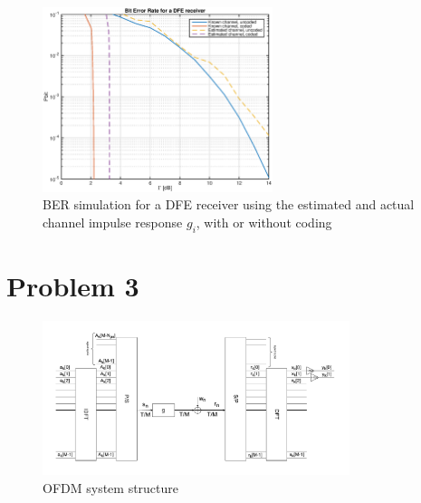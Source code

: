 \documentclass[10pt]{article}
\begin{document}

\begin{figure}[H]
	\centering
	\includegraphics[width = 0.6\textwidth]{problem2}
	\caption{BER simulation for a DFE receiver using the estimated and actual channel impulse response $g_i$, with or without coding}
	\label{fig:problem2_pbit}
\end{figure}

\FloatBarrier

\section*{Problem 3}

\begin{figure}[h!]
	\centering
	\includegraphics[width = 0.8\textwidth]{OFDM}
	\caption{OFDM system structure}
	\label{fig:OFDM}
\end{figure}
\end{document}
